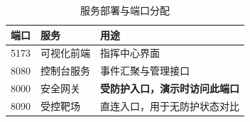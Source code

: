 \begin{table}[htbp]
\centering
\caption{服务部署与端口分配}
\label{tab:deployment}
\small
\begin{tabular}{@{}c l l@{}}
\toprule
\textbf{端口} & \textbf{服务} & \textbf{用途} \\
\midrule
5173 & 可视化前端 & 指挥中心界面 \\
8080 & 控制台服务 & 事件汇聚与管理接口 \\
8000 & 安全网关   & \textbf{受防护入口，演示时访问此端口} \\
8090 & 受控靶场   & 直连入口，用于无防护状态对比 \\
\bottomrule
\end{tabular}
\end{table}
